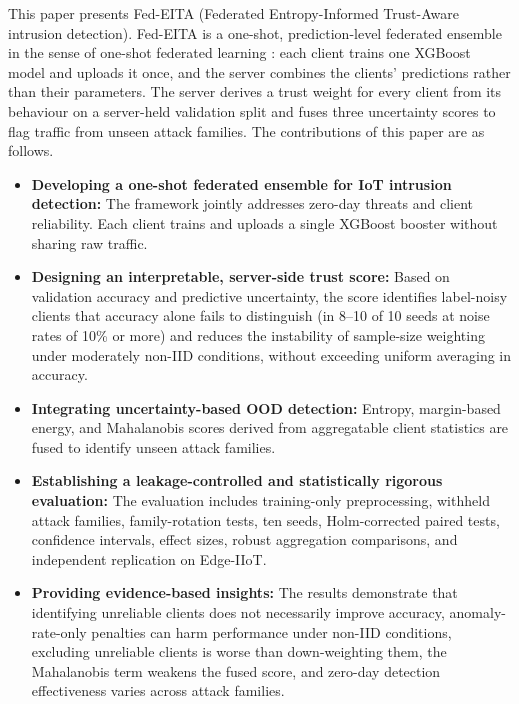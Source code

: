 \documentclass[pdflatex,sn-mathphys-num]{sn-jnl}
\newcommand{\Rtwo}{\color{blue}}
\begin{document}
{\color{black}
This paper presents Fed-EITA (Federated Entropy-Informed Trust-Aware intrusion detection). Fed-EITA is a one-shot, prediction-level federated ensemble in the sense of one-shot federated learning \cite{guha2019oneshot}: each client trains one XGBoost model and uploads it once, and the server combines the clients' predictions rather than their parameters. The server derives a trust weight for every client from its behaviour on a server-held validation split and fuses three uncertainty scores to flag traffic from unseen attack families. The contributions of this paper are as follows.

\begin{itemize}

\item \textbf{Developing a one-shot federated ensemble for IoT intrusion detection:}
The framework jointly addresses zero-day threats and client reliability. Each client trains and uploads a single XGBoost booster without sharing raw traffic.%

\item \textbf{Designing an interpretable, server-side trust score:}
Based on validation accuracy and predictive uncertainty, the score identifies label-noisy clients that accuracy alone fails to distinguish {\Rtwo (in 8--10 of 10 seeds at noise rates of 10\% or more)} %
and reduces the instability of sample-size weighting under moderately non-IID conditions, %
without exceeding uniform averaging in accuracy.

\item \textbf{Integrating uncertainty-based OOD detection:}
Entropy, margin-based energy, and Mahalanobis scores derived from aggregatable client statistics are fused to identify unseen attack families.%

\item \textbf{Establishing a leakage-controlled and statistically rigorous evaluation:}
The evaluation includes training-only preprocessing, withheld attack families, family-rotation tests, ten seeds, Holm-corrected paired tests, confidence intervals, effect sizes, robust aggregation comparisons, and independent replication on Edge-IIoT.

\item \textbf{Providing evidence-based insights:}
The results demonstrate that identifying unreliable clients does not necessarily improve accuracy, anomaly-rate-only penalties can harm performance under non-IID conditions, {\Rtwo excluding unreliable clients is worse than down-weighting them, the Mahalanobis term weakens the fused score,} and zero-day detection effectiveness varies across attack families.


\end{itemize}}
\end{document}
